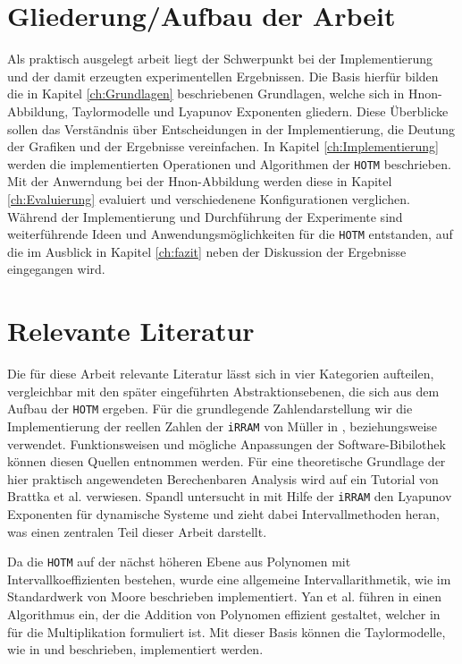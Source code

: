 \section{Gliederung/Aufbau der Arbeit}
\label{ch:Einleitung:sec:Gliederung}

Als praktisch ausgelegt arbeit liegt der Schwerpunkt bei der Implementierung und der damit erzeugten experimentellen Ergebnissen. Die Basis hierfür bilden die in Kapitel \ref{ch:Grundlagen} beschriebenen Grundlagen, welche sich in H\e non-Abbildung, Taylormodelle und Lyapunov Exponenten gliedern. Diese Überblicke sollen das Verständnis über Entscheidungen in der Implementierung, die Deutung der Grafiken und der Ergebnisse vereinfachen. In Kapitel \ref{ch:Implementierung} werden die implementierten Operationen und Algorithmen der \verb+HOTM+ beschrieben. Mit der Anwerndung bei der H\e non-Abbildung werden diese in Kapitel \ref{ch:Evaluierung} evaluiert und verschiedenene Konfigurationen verglichen. Während der Implementierung und Durchführung der Experimente sind weiterführende Ideen und Anwendungsmöglichkeiten für die \verb+HOTM+ entstanden, auf die im Ausblick in Kapitel \ref{ch:fazit} neben der Diskussion der Ergebnisse eingegangen wird.

\section{Relevante Literatur}
Die für diese Arbeit relevante Literatur lässt sich in vier Kategorien aufteilen, vergleichbar mit den später eingeführten Abstraktionsebenen, die sich aus dem Aufbau der \verb+HOTM+ ergeben. Für die grundlegende Zahlendarstellung wir die Implementierung der reellen Zahlen der \verb+iRRAM+ von Müller in \cite{Mller2009EnhancingIE}, beziehungsweise \cite{mueller2001} verwendet. Funktionsweisen und mögliche Anpassungen der Software-Bibilothek können diesen Quellen entnommen werden. Für eine theoretische Grundlage der hier praktisch angewendeten Berechenbaren Analysis wird auf ein Tutorial von Brattka et al. \cite{Brattka2008} verwiesen. Spandl untersucht in \cite{DBLP:spandl} mit Hilfe der \verb+iRRAM+ den Lyapunov Exponenten für dynamische Systeme und zieht dabei Intervallmethoden heran, was einen zentralen Teil dieser Arbeit darstellt. 

Da die \verb+HOTM+ auf der nächst höheren Ebene aus Polynomen mit Intervallkoeffizienten bestehen, wurde eine allgemeine Intervallarithmetik, wie im Standardwerk von Moore \cite{moore1979} beschrieben implementiert. Yan et al. führen in \cite{geobuckets} einen Algorithmus ein, der die Addition von Polynomen effizient gestaltet, welcher in \cite{geobucketsmulti} für die Multiplikation formuliert ist. Mit dieser Basis können die Taylormodelle, wie in \cite{makino2001} und \cite{DBLP:conf/macis/BrausseKM15} beschrieben, implementiert werden.

